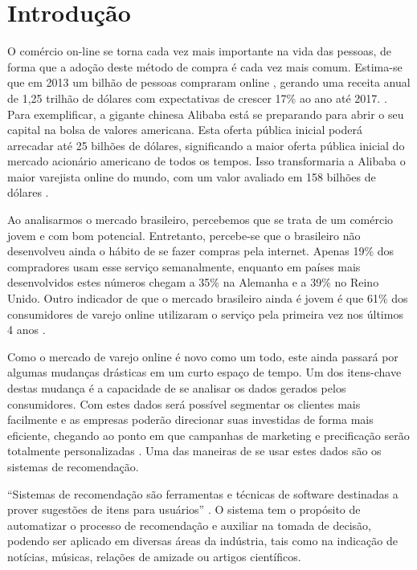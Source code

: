 \chapter[Introdução]{Introdução}
\label{chap:introducao}

O comércio on-line se torna cada vez mais importante na vida das pessoas, de forma que a adoção deste método de compra é cada vez mais comum. Estima-se que em 2013 um bilhão de pessoas compraram online \cite{emarketerB2CEcommerceClimbs}, gerando uma receita anual de 1,25 trilhão de dólares com expectativas de crescer 17\% ao ano até 2017. \cite{emarketerGlobalB2CSales}. Para exemplificar, a gigante chinesa Alibaba está se preparando para abrir o seu capital na bolsa de valores americana. Esta oferta pública inicial poderá arrecadar até 25 bilhões de dólares, significando a maior oferta pública inicial do mercado acionário americano de todos os tempos. Isso transformaria a Alibaba o maior varejista online do mundo, com um valor avaliado em 158 bilhões de dólares \cite{ForbesAlibabaBoostsIPO}.

Ao analisarmos o mercado brasileiro, percebemos que se trata de um comércio jovem e com bom potencial. Entretanto, percebe-se que o brasileiro não desenvolveu ainda o hábito de se fazer compras pela internet. Apenas 19\% dos compradores usam esse serviço semanalmente, enquanto em países mais desenvolvidos estes números chegam a 35\% na Alemanha e a 39\% no Reino Unido. Outro indicador de que o mercado brasileiro ainda é jovem é que 61\% dos consumidores de varejo online utilizaram o serviço pela primeira vez nos últimos 4 anos \cite{PWCTotalRetail}.

Como o mercado de varejo online é novo como um todo, este ainda passará por algumas mudanças drásticas em um curto espaço de tempo. Um dos itens-chave destas mudança é a capacidade de se analisar os dados gerados pelos consumidores. Com estes dados será possível segmentar os clientes mais facilmente e as empresas poderão direcionar suas investidas de forma mais eficiente, chegando ao ponto em que campanhas de marketing e precificação serão totalmente personalizadas \cite{BCGThegotomarketrevolution}. Uma das maneiras de se usar estes dados são os sistemas de recomendação.

``Sistemas de recomendação são ferramentas e técnicas de software destinadas a prover sugestões de itens para usuários'' \cite{ricci2011introduction-chap1}. O sistema tem o propósito de automatizar o processo de recomendação e auxiliar na tomada de decisão, podendo ser aplicado em diversas áreas da indústria, tais como na indicação de notícias, músicas, relações de amizade ou artigos científicos.

